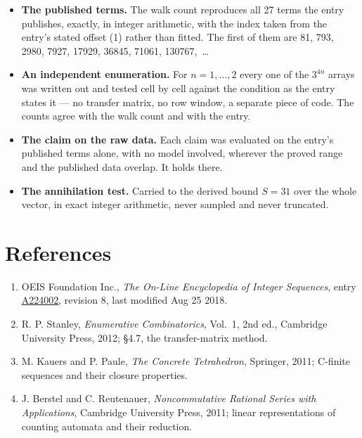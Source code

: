 \documentclass[11pt]{article}
\theoremstyle{definition}
\begin{document}
\begin{itemize}

\item {\bfseries The published terms.} The walk count reproduces all 27 terms the entry publishes, exactly, in integer arithmetic, with the index taken from the entry's stated offset (1) rather than fitted. The first of them are 81, 793, 2980, 7927, 17929, 36845, 71061, 130767,~\dots

\item {\bfseries An independent enumeration.} For $n = 1,\dots,2$ every one of the $3^{4n}$ arrays was written out and tested cell by cell against the condition as the entry states it --- no transfer matrix, no row window, a separate piece of code. The counts agree with the walk count and with the entry.

\item {\bfseries The claim on the raw data.} Each claim was evaluated on the entry's published terms alone, with no model involved, wherever the proved range and the published data overlap. It holds there.

\item {\bfseries The annihilation test.} Carried to the derived bound $S = 31$ over the whole vector, in exact integer arithmetic, never sampled and never truncated.

\end{itemize}

\section{References}

\begin{enumerate}

\item OEIS Foundation Inc., \emph{The On-Line Encyclopedia of Integer Sequences}, entry \href{https://oeis.org/A224002}{A224002}, revision 8, last modified Aug 25 2018.

\item R. P. Stanley, \emph{Enumerative Combinatorics}, Vol.~1, 2nd ed., Cambridge University Press, 2012; \S4.7, the transfer-matrix method.

\item M. Kauers and P. Paule, \emph{The Concrete Tetrahedron}, Springer, 2011; C-finite sequences and their closure properties.

\item J. Berstel and C. Reutenauer, \emph{Noncommutative Rational Series with Applications}, Cambridge University Press, 2011; linear representations of counting automata and their reduction.

\end{enumerate}
\end{document}
